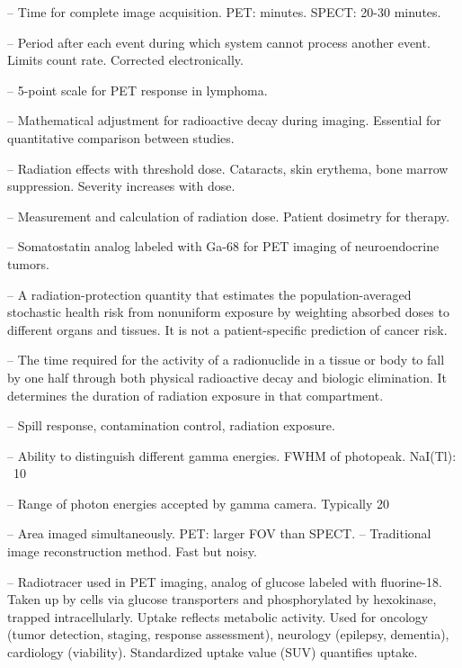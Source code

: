 -- Time for complete image acquisition. PET: minutes. SPECT: 20-30 minutes.

-- Period after each event during which system cannot process another event. Limits count rate. Corrected electronically.

-- 5-point scale for PET response in lymphoma.

-- Mathematical adjustment for radioactive decay during imaging. Essential for quantitative comparison between studies.

-- Radiation effects with threshold dose. Cataracts, skin erythema, bone marrow suppression. Severity increases with dose.

-- Measurement and calculation of radiation dose. Patient dosimetry for therapy.

-- Somatostatin analog labeled with Ga-68 for PET imaging of neuroendocrine tumors.

-- A radiation-protection quantity that estimates the population-averaged stochastic health risk from nonuniform exposure by weighting absorbed doses to different organs and tissues. It is not a patient-specific prediction of cancer risk.

-- The time required for the activity of a radionuclide in a tissue or body to fall by one half through both physical radioactive decay and biologic elimination. It determines the duration of radiation exposure in that compartment.

-- Spill response, contamination control, radiation exposure.

-- Ability to distinguish different gamma energies. FWHM of photopeak. NaI(Tl): ~10%

-- Range of photon energies accepted by gamma camera. Typically 20%

-- Area imaged simultaneously. PET: larger FOV than SPECT.
-- Traditional image reconstruction method. Fast but noisy.

-- Radiotracer used in PET imaging, analog of glucose labeled with fluorine-18. Taken up by cells via glucose transporters and phosphorylated by hexokinase, trapped intracellularly. Uptake reflects metabolic activity. Used for oncology (tumor detection, staging, response assessment), neurology (epilepsy, dementia), cardiology (viability). Standardized uptake value (SUV) quantifies uptake.

